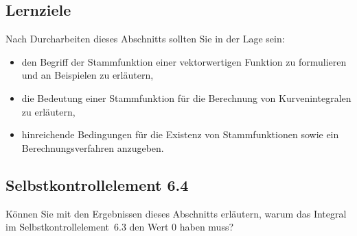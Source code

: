 \documentclass[a4paper,12pt]{article}
\begin{document}
\begin{center}
\end{center}

\subsection*{Lernziele}

Nach Durcharbeiten dieses Abschnitts sollten Sie in der Lage sein:
\begin{itemize}
  \item den Begriff der Stammfunktion einer vektorwertigen Funktion zu
        formulieren und an Beispielen zu erläutern,
  \item die Bedeutung einer Stammfunktion für die Berechnung von
        Kurvenintegralen zu erläutern,
  \item hinreichende Bedingungen für die Existenz von Stammfunktionen sowie
        ein Berechnungsverfahren anzugeben.
\end{itemize}

\subsection*{Selbstkontrollelement 6.4}

Können Sie mit den Ergebnissen dieses Abschnitts erläutern, warum das
Integral im Selbstkontrollelement~6.3 den Wert $0$ haben muss?

\newpage
\end{document}
